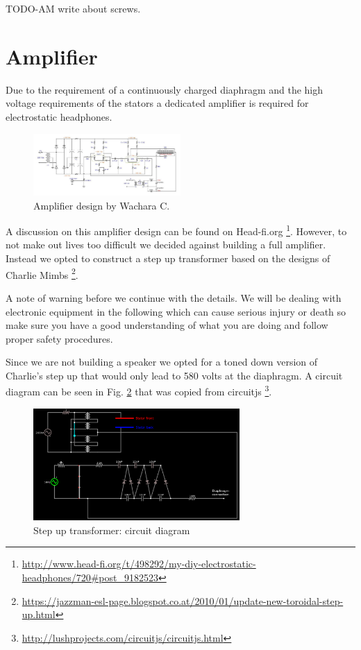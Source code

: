 \documentclass{article}
\begin{document}
TODO-AM write about screws.

\section{Amplifier}
\label{s:amp}
Due to the requirement of a continuously charged diaphragm and the high voltage requirements of the stators a dedicated amplifier is required for electrostatic headphones.
\begin{figure}[htb]
    \centering
    \includegraphics[width=0.5\textwidth]{images/wachara-amp.png}
    \caption{Amplifier design by Wachara C.}
    \label{f:amp:wachara}
\end{figure}
A discussion on this amplifier design can be found on Head-fi.org \footnote{\url{http://www.head-fi.org/t/498292/my-diy-electrostatic-headphones/720#post_9182523}}. However, to not make out lives too difficult we decided against building a full amplifier. Instead we opted to construct a step up transformer based on the designs of Charlie Mimbs \footnote{\url{https://jazzman-esl-page.blogspot.co.at/2010/01/update-new-toroidal-step-up.html}}.

A note of warning before we continue with the details. We will be dealing with electronic equipment in the following which can cause serious injury or death so make sure you have a good understanding of what you are doing and follow proper safety procedures.

Since we are not building a speaker we opted for a toned down version of Charlie's step up that would only lead to 580 volts at the diaphragm. A circuit diagram can be seen in Fig. \ref{f:amp:step-up} that was copied from circuitjs \footnote{\url{http://lushprojects.com/circuitjs/circuitjs.html}}.

\begin{figure}[htb]
    \centering
    \includegraphics[width=0.7\textwidth]{images/step-up-transformer.png}
    \caption{Step up transformer: circuit diagram}
    \label{f:amp:step-up}
\end{figure}
\end{document}
